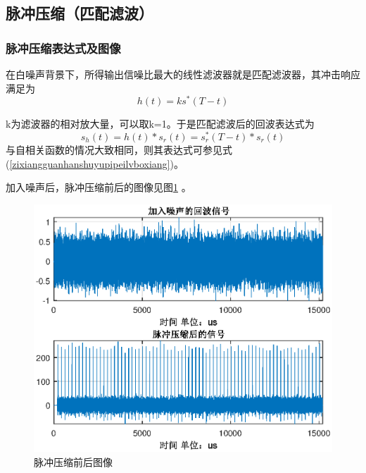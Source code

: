 \documentclass[12pt]{article}
\begin{document}
\subsection{脉冲压缩（匹配滤波）}
\subsubsection{脉冲压缩表达式及图像}
在白噪声背景下，所得输出信噪比最大的线性滤波器就是匹配滤波器，其冲击响应满足为
\begin{equation}\label{chongjixiangying}
  h(t)=ks^*(T-t)
\end{equation}\par
k为滤波器的相对放大量，可以取k=1。于是匹配滤波后的回波表达式为
\begin{equation}\label{pipeilubohou}
  s_h(t)=h(t)*s_r(t)=s_r^*(T-t)*s_r(t)
\end{equation}
与自相关函数的情况大致相同，则其表达式可参见式(\ref{zixiangguanhanshuyupipeilvboxiang})。\par
加入噪声后，脉冲压缩前后的图像见图\ref{maichongyasuotuxiang}
。
\begin{figure}[htbp]
  \centering
  \includegraphics[width=\textwidth]{maiyaqianhou}
  \caption{脉冲压缩前后图像}\label{maichongyasuotuxiang}
\end{figure}
\end{document}
